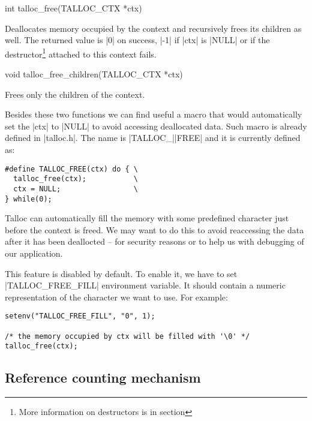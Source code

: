 \begin{funcproto}
int talloc_free(TALLOC_CTX *ctx)
\end{funcproto}
\begin{funcdesc}
  Deallocates memory occupied by the context and recursively frees its 
  children as well. The returned value is |0| on success, |-1| if |ctx| is
  |NULL| or if the destructor\footnote{More information on destructors is in
  section } attached to this context fails.
\end{funcdesc}
\begin{funcproto}
void talloc_free_children(TALLOC_CTX *ctx)
\end{funcproto}
\begin{funcdesc}
  Frees only the children of the context.
\end{funcdesc}
\funclistend
Besides these two functions we can find useful a macro that would automatically
set the |ctx| to |NULL| to avoid accessing deallocated data. Such macro is
already defined in |talloc.h|. The name is |TALLOC_||FREE| and it is
currently defined as:

\begin{lstlisting}[caption={TALLOC_FREE(ctx)},label=lst:TALLOC_FREE]
#define TALLOC_FREE(ctx) do { \
  talloc_free(ctx);           \
  ctx = NULL;                 \
} while(0);
\end{lstlisting}

\noindent
Talloc can automatically fill the memory with some predefined character just
before the context is freed. We may want to do this to avoid reaccessing the
data after it has been deallocted -- for security reasons or to help us with
debugging of our application.

This feature is disabled by default. To enable it, we have to set
|TALLOC_FREE_FILL| environment variable. It should contain a numeric
representation of the character we want to use. For example:

\begin{lstlisting}[caption={Automatically fill the memory}]
setenv("TALLOC_FREE_FILL", "0", 1);

/* the memory occupied by ctx will be filled with '\0' */
talloc_free(ctx);
\end{lstlisting}

\subsection{Reference counting mechanism}
\label{talloc:ref-counter}

